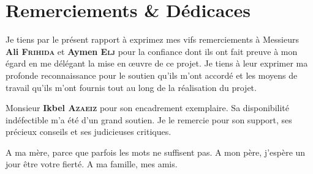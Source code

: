
\chapter*{Remerciements \& Dédicaces}

Je tiens par le présent rapport à exprimez mes vifs remerciements à Messieurs \textbf{Ali \textsc{Frihida}} et \textbf{Aymen \textsc{Elj}} pour la confiance dont ils ont fait preuve à mon égard en me délégant la mise en œuvre de ce projet. Je tiens à leur exprimer ma profonde reconnaissance pour le soutien qu'ils m'ont accordé et les moyens de travail qu'ils m'ont fournis tout au long de la réalisation du projet.

Monsieur \textbf{Ikbel \textsc{Azaeiz}} pour son encadrement exemplaire. Sa disponibilité indéfectible m'a été d'un grand soutien. Je le remercie pour son support, ses précieux conseils et ses judicieuses critiques.

A ma mère, parce que parfois les mots ne suffisent pas.
A mon père, j'espère un jour être votre fierté.
A ma famille, mes amis. 